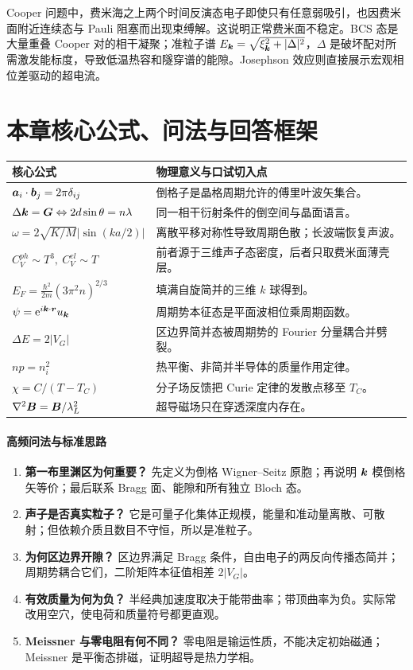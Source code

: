 Cooper 问题中，费米海之上两个时间反演态电子即使只有任意弱吸引，也因费米面附近连续态与 Pauli 阻塞而出现束缚解。这说明正常费米面不稳定。BCS 态是大量重叠 Cooper 对的相干凝聚；准粒子谱
$E_{\bm{k}}=\sqrt{\xi_{\bm{k}}^2+|\Delta|^2}$，$\Delta$ 是破坏配对所需激发能标度，导致低温热容和隧穿谱的能隙。Josephson 效应则直接展示宏观相位差驱动的超电流。

\section{本章核心公式、问法与回答框架}
\begin{longtable}{p{}p{}}
\toprule
核心公式&物理意义与口试切入点\\\midrule
\endhead
$\bm{a}_i\cdot\bm{b}_j=2\pi\delta_{ij}$&倒格子是晶格周期允许的傅里叶波矢集合。\\
$\Delta\bm{k}=\bm{G}\Leftrightarrow2d\sin\theta=n\lambda$&同一相干衍射条件的倒空间与晶面语言。\\
$\omega=2\sqrt{K/M}|\sin(ka/2)|$&离散平移对称性导致周期色散；长波端恢复声波。\\
$C_V^{ph}\sim T^3,\ C_V^{el}\sim T$&前者源于三维声子态密度，后者只取费米面薄壳层。\\
$E_F=\frac{\hbar^2}{2m}(3\pi^2n)^{2/3}$&填满自旋简并的三维 $k$ 球得到。\\
$\psi=\mathrm e^{i\bm{k}\cdot\bm{r}}u_{\bm{k}}$&周期势本征态是平面波相位乘周期函数。\\
$\Delta E=2|V_G|$&区边界简并态被周期势的 Fourier 分量耦合并劈裂。\\
$np=n_i^2$&热平衡、非简并半导体的质量作用定律。\\
$\chi=C/(T-T_C)$&分子场反馈把 Curie 定律的发散点移至 $T_C$。\\
$\nabla^2\bm{B}=\bm{B}/\lambda_L^2$&超导磁场只在穿透深度内存在。\\\bottomrule
\end{longtable}

\paragraph{高频问法与标准思路}
\begin{enumerate}
\item \textbf{第一布里渊区为何重要？} 先定义为倒格 Wigner--Seitz 原胞；再说明 $\bm{k}$ 模倒格矢等价；最后联系 Bragg 面、能隙和所有独立 Bloch 态。
\item \textbf{声子是否真实粒子？} 它是可量子化集体正规模，能量和准动量离散、可散射；但依赖介质且数目不守恒，所以是准粒子。
\item \textbf{为何区边界开隙？} 区边界满足 Bragg 条件，自由电子的两反向传播态简并；周期势耦合它们，二阶矩阵本征值相差 $2|V_G|$。
\item \textbf{有效质量为何为负？} 半经典加速度取决于能带曲率；带顶曲率为负。实际常改用空穴，使电荷和质量符号都更直观。
\item \textbf{Meissner 与零电阻有何不同？} 零电阻是输运性质，不能决定初始磁通；Meissner 是平衡态排磁，证明超导是热力学相。
\end{enumerate}
